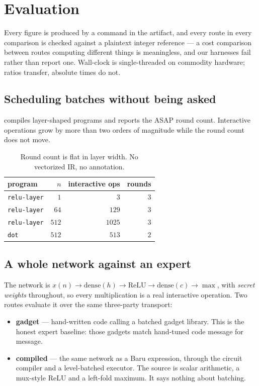 \documentclass[11pt]{article}
\newcommand{\bt}[1]{\texttt{#1}}
\begin{document}
\section{Evaluation}\label{sec:eval}

Every figure is produced by a command in the artifact, and every route in
every comparison is checked against a plaintext integer reference --- a cost
comparison between routes computing different things is meaningless, and our
harnesses fail rather than report one. Wall-clock is single-threaded on
commodity hardware; ratios transfer, absolute times do not.

\subsection{Scheduling batches without being asked}\label{sec:eval-sched}

 compiles layer-shaped programs and reports the ASAP round
count. Interactive operations grow by more than two orders of magnitude while
the round count does not move.

\begin{table}[t]
\centering
\caption{Round count is flat in layer width. No vectorized IR, no
annotation.}
\label{tab:flat}
\begin{tabular}{@{}lrrr@{}}
\toprule
program & $n$ & interactive ops & rounds \\
\midrule
\bt{relu-layer} & $1$ & $3$ & $3$ \\
\bt{relu-layer} & $64$ & $129$ & $3$ \\
\bt{relu-layer} & $512$ & $1025$ & $3$ \\
\bt{dot} & $512$ & $513$ & $2$ \\
\bottomrule
\end{tabular}
\end{table}

\subsection{A whole network against an expert}\label{sec:eval-network}

The network is $x(n) \to \mathrm{dense}(h) \to \mathrm{ReLU} \to
\mathrm{dense}(c) \to \max$, with \emph{secret weights} throughout, so every
multiplication is a real interactive operation. Two routes evaluate it over
the same three-party transport:

\begin{itemize}
\item \textbf{gadget} --- hand-written code calling a batched gadget library.
This is the honest expert baseline: those gadgets match hand-tuned code
message for message.
\item \textbf{compiled} --- the same network as a Baru expression, through the
circuit compiler and a level-batched executor. The source is scalar
arithmetic, a mux-style ReLU and a left-fold maximum. It says nothing about
batching.
\end{itemize}
\end{document}
